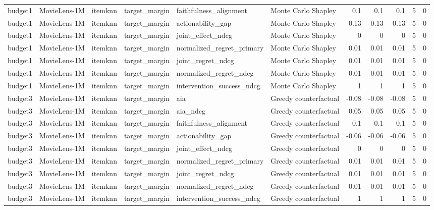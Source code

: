 \begin{table}[t]
{\begin{tabular}{llllllrrrrr}
budget1 & MovieLens-1M & itemknn & target\_margin & faithfulness\_alignment & Monte Carlo Shapley & 0.1 & 0.1 & 0.1 & 5 & 0 \\
budget1 & MovieLens-1M & itemknn & target\_margin & actionability\_gap & Monte Carlo Shapley & 0.13 & 0.13 & 0.13 & 5 & 0 \\
budget1 & MovieLens-1M & itemknn & target\_margin & joint\_effect\_ndcg & Monte Carlo Shapley & 0 & 0 & 0 & 5 & 0 \\
budget1 & MovieLens-1M & itemknn & target\_margin & normalized\_regret\_primary & Monte Carlo Shapley & 0.01 & 0.01 & 0.01 & 5 & 0 \\
budget1 & MovieLens-1M & itemknn & target\_margin & joint\_regret\_ndcg & Monte Carlo Shapley & 0.01 & 0.01 & 0.01 & 5 & 0 \\
budget1 & MovieLens-1M & itemknn & target\_margin & normalized\_regret\_ndcg & Monte Carlo Shapley & 0.01 & 0.01 & 0.01 & 5 & 0 \\
budget1 & MovieLens-1M & itemknn & target\_margin & intervention\_success\_ndcg & Monte Carlo Shapley & 1 & 1 & 1 & 5 & 0 \\
budget3 & MovieLens-1M & itemknn & target\_margin & aia & Greedy counterfactual & -0.08 & -0.08 & -0.08 & 5 & 0 \\
budget3 & MovieLens-1M & itemknn & target\_margin & aia\_ndcg & Greedy counterfactual & 0.05 & 0.05 & 0.05 & 5 & 0 \\
budget3 & MovieLens-1M & itemknn & target\_margin & faithfulness\_alignment & Greedy counterfactual & 0.1 & 0.1 & 0.1 & 5 & 0 \\
budget3 & MovieLens-1M & itemknn & target\_margin & actionability\_gap & Greedy counterfactual & -0.06 & -0.06 & -0.06 & 5 & 0 \\
budget3 & MovieLens-1M & itemknn & target\_margin & joint\_effect\_ndcg & Greedy counterfactual & 0 & 0 & 0 & 5 & 0 \\
budget3 & MovieLens-1M & itemknn & target\_margin & normalized\_regret\_primary & Greedy counterfactual & 0.01 & 0.01 & 0.01 & 5 & 0 \\
budget3 & MovieLens-1M & itemknn & target\_margin & joint\_regret\_ndcg & Greedy counterfactual & 0.01 & 0.01 & 0.01 & 5 & 0 \\
budget3 & MovieLens-1M & itemknn & target\_margin & normalized\_regret\_ndcg & Greedy counterfactual & 0.01 & 0.01 & 0.01 & 5 & 0 \\
budget3 & MovieLens-1M & itemknn & target\_margin & intervention\_success\_ndcg & Greedy counterfactual & 1 & 1 & 1 & 5 & 0 \\

\end{tabular}}
\end{table}
